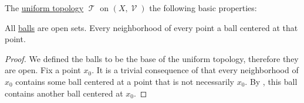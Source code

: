 \begin{proposition}\label{thm:uniform_topology_properties}
  The \hyperref[def:uniform_topology]{uniform topology} \( \mscrT \) on \( (X, \mscrV) \) the following basic properties:
  \begin{propenum}
     All \hyperref[def:entourage/ball]{balls} are open sets.
     Every neighborhood of every point a ball centered at that point.
  \end{propenum}
\end{proposition}
\begin{proof}
   We defined the balls to be the base of the uniform topology, therefore they are open.
   Fix a point \( x_0 \). It is a trivial consequence of  that every neighborhood of \( x_0 \) contains some ball centered at a point that is not necessarily \( x_0 \). By , this ball contains another ball centered at \( x_0 \).
\end{proof}

